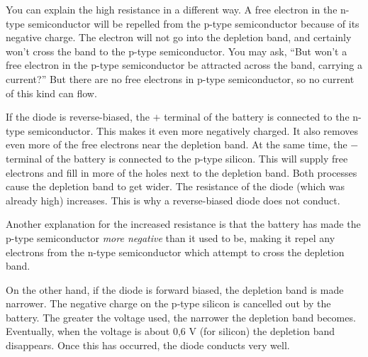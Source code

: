 You can explain the high resistance in a different way.  A free electron in the n-type semiconductor will be repelled from the p-type semiconductor because of its negative charge.  The electron will not go into the depletion band, and certainly won't cross the band to the p-type semiconductor.  You may ask, ``But won't a free electron in the p-type semiconductor be attracted across the band, carrying a current?''  But there are no free electrons in p-type semiconductor, so no current of this kind can flow.

If the diode is reverse-biased, the $+$ terminal of the battery is connected to the n-type semiconductor.  This makes it even more negatively charged.  It also removes even more of the free electrons near the depletion band.  At the same time, the $-$ terminal of the battery is connected to the p-type silicon.  This will supply free electrons and fill in more of the holes next to the depletion band.  Both processes cause the depletion band to get wider.  The resistance of the diode (which was already high) increases.  This is why a reverse-biased diode does not conduct.

Another explanation for the increased resistance is that the battery has made the p-type semiconductor {\it more negative} than it used to be, making it repel any electrons from the n-type semiconductor which attempt to cross the depletion band.

On the other hand, if the diode is forward biased, the depletion band is made narrower.  The negative charge on the p-type silicon is cancelled out by the battery.  The greater the voltage used, the narrower the depletion band becomes.  Eventually, when the voltage is about 0,6 V (for silicon) the depletion band disappears.  Once this has occurred, the diode conducts very well.  


